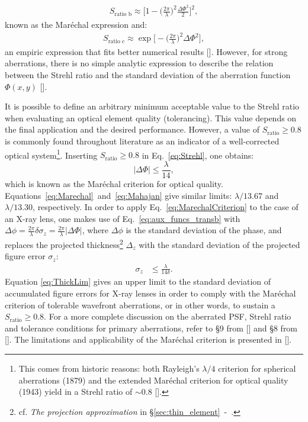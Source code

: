 \begin{refsection}
\begin{align}\label{eq:Marechal}
    S_{\text{ratio b}}\approx\bigg[1-\bigg(\frac{2\pi}{\lambda}\bigg)^2\frac{\Delta\Phi^2}{2}\bigg]^2,
\end{align}
known as the Mar\'echal expression and:
\begin{align}\label{eq:Mahajan}
    S_{\text{ratio c}}\approx\exp{\bigg[- \bigg(\frac{2\pi}{\lambda}\bigg)^2\Delta\Phi^2\bigg]},
\end{align}
an empiric expression that fits better numerical results [\cite{Wetherell1980}]. However, for strong aberrations, there is no simple analytic expression to describe the relation between the Strehl ratio and the standard deviation of the aberration function $\Phi(x,y)$ [\cite{Kessler81}]. 

It is possible to define an arbitrary minimum acceptable value to the Strehl ratio when evaluating an optical element quality (tolerancing). This value depends on the final application and the desired performance. However, a value of $S_\text{ratio}\geq0.8$ is commonly found throughout literature as an indicator of a well-corrected optical system\footnote{This comes from historic reasons: both Rayleigh's $\lambda/4$ criterion for spherical aberrations (1879) and the extended Mar\'echal criterion for optical quality (1943) yield in a Strehl ratio of $\sim0.8$ [\cite{born_wolf1999}].}. Inserting $S_\text{ratio}\geq0.8$ in Eq.~\ref{eq:Strehl}, one obtains:
\begin{equation}\label{eq:MarechalCriterion}
    |\Delta\Phi|\leq\frac{\lambda}{14},
\end{equation}{}
which is known as the Mar\'echal criterion for optical quality. Equations~\ref{eq:Marechal}~and~\ref{eq:Mahajan} give similar limits: $\lambda/13.67$ and $\lambda/13.30$, respectively. In order to apply  Eq.~\ref{eq:MarechalCriterion} to the case of an X-ray lens, one makes use of Eq.~\ref{eq:aux_funcs_transb} with $\Delta\phi =\frac{2\pi}{\lambda}\delta\sigma_z=\frac{2\pi}{\lambda}|\Delta\Phi|$, where $\Delta\phi$ is the  standard deviation of the phase, and replaces the projected thickness\footnote{cf. \textit{The projection approximation} in \S\ref{sec:thin_element}~-~\textit{}.} $\Delta_z$ with the standard deviation of the projected figure error $\sigma_z$:
\begin{align}\label{eq:ThickLim}
    \sigma_z &\leq \frac{\lambda}{14\delta}.
\end{align}{}
Equation \ref{eq:ThickLim} gives an upper limit to the standard deviation of accumulated figure errors for X-ray lenses in order to comply with the Mar\'echal criterion of tolerable wavefront aberrations, or in other words, to sustain a $S_\text{ratio}\geq0.8$. For a more complete discussion on the aberrated PSF, Strehl ratio and tolerance conditions for primary aberrations, refer to \S9 from [\cite{born_wolf1999}] and \S8 from [\cite{Mahajan2011}]. The limitations and applicability of the Maréchal criterion is presented in [\cite{Ross2009}].


\end{refsection}
